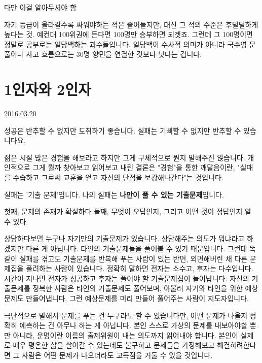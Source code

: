 다만 이걸 알아두셔야 함
\vspace{5mm}

자기 등급이 올라갈수록 싸워야하는 적은 줄어들지만, 대신 그 적의 수준은 후덜덜하게 높다는 것.
예컨대 100위권에 든다면 100명만 승부하면 되겟죠. 그런데 그 100명이면 정말로 공부로는 일당백하는 괴수들입니다.
일당백이 수사적 의미가 아니라 국수영 문풀이나 사고 흐름으로는 30명 양민을 연결한 것보다 낫다는 겁니다.
\vspace{5mm}





\section{1인자와 2인자}
\href{https://www.kockoc.com/Apoc/684760}{2016.03.20}

\vspace{5mm}

성공은 반추할 수 없지만 도취하기 좋습니다.
실패는 기뻐할 수 없지만 반추할 수 있습니다요.
\vspace{5mm}

젊은 시절 많은 경험을 해보라고 하지만 그게 구체적으로 뭔지 말해주진 않습니다.
개인적으로 그게 뭘까 찾아보고 읽어보고 내린 결론은
"경험"을 통한 깨달음이란, "실패를 수습하고 그로써 교훈을 얻고 자신의 단점을 보강해나간다"는 것입니다.
\vspace{5mm}

실패는 '기출 문제'입니다.
나의 실패는 \textbf{나만이 풀 수 있는 기출문제}입니다.
\vspace{5mm}

첫째, 문제의 존재가 확실하다
둘째, 무엇이 오답인지, 그리고 어떤 것이 정답인지 알 수 있다.
\vspace{5mm}

상담하다보면 누구나 자기만의 기출문제가 있습니다.
상담해주는 의도가 뭐냐라고 하겠지만 다른 게 아닙니다. 타인의 기출문제들을 풀어볼 수 있기 때문입니다.
그런데 똑같이 실패를 겪고도 기출문제를 반복해 푸는 사람이 있는 반면, 외면해버린 채 다른 문제집을 풀려하는 사람이 있습니다.
정확히 말하면 전자는 소수고, 후자는 다수입니다. 시간이 지나면 전자가 성공하고 후자는 풀어야 할 기출문제집이 늘어납니다.
자신의 기출문제를 정복한 사람은 타인의 기출문제도 풀어보며, 아울러 자기와 타인을 위한 예상문제도 만들어냅니다.
그런 예상문제를 미리 만들어 풀어주는 사람이 지도자입니다.
\vspace{5mm}

극단적으로 말해서 문제를 푸는 건 누구라도 할 수 있습니다만, 어떤 문제가 나올지 정확히 예측하는 건 아무나 하는 게 아닙니다.
본인 스스로 가상의 문제를 내보아야할 뿐만 아니라, 운명이란 이름의 출제위원이 내는 의도까지 읽어내야 합니다.
본인이 실제로 매우 평온한 삶을 살아갈 수 있는데도 불구하고 문제들을 가정해보고 해결하려한다면
그 사람은 어떤 문제가 나오더라도 고득점을 거둘 수 있을 것입니다.
\vspace{5mm}

